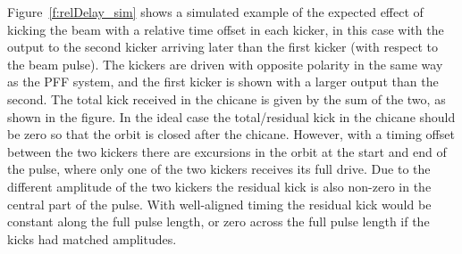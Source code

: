 Figure~\ref{f:relDelay_sim} shows a simulated example of the expected effect of kicking the beam with a relative time offset in each kicker, in this case with the output to the second kicker arriving later than the first kicker (with respect to the beam pulse). The kickers are driven with opposite polarity in the same way as the PFF system, and the first kicker is shown with a larger output than the second. The total kick received in the chicane is given by the sum of the two, as shown in the figure. In the ideal case the total/residual kick in the chicane should be zero so that the orbit is closed after the chicane. However, with a timing offset between the two kickers there are excursions in the orbit at the start and end of the pulse, where only one of the two kickers receives its full drive. Due to the different amplitude of the two kickers the residual kick is also non-zero in the central part of the pulse. With well-aligned timing the residual kick would be constant along the full pulse length, or zero across the full pulse length if the kicks had matched amplitudes.


